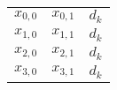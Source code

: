 \begin{table}
    \centering
    \begin{tabular}{ccc}
        \(x_{0,0}\) \color{blue}{0} & \(x_{0,1}\) \color{blue}{0} & \(d_k\) \color{green}{0} \\
        \(x_{1,0}\) \color{blue}{0} & \(x_{1,1}\) \color{red}{1} & \(d_k\) \color{green}{1} \\
        \(x_{2,0}\) \color{red}{1} & \(x_{2,1}\) \color{blue}{0} & \(d_k\) \color{green}{1} \\
        \(x_{3,0}\) \color{red}{1} & \(x_{3,1}\) \color{red}{1} & \(d_k\) \color{green}{0} \\
    \end{tabular}
\end{table}